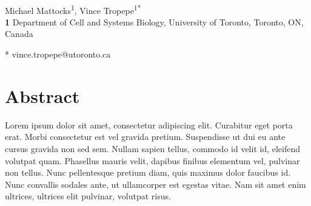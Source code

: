 \documentclass[10pt,letterpaper]{article}
\begin{document}
\vspace*{0.2in}

\begin{flushleft}
{\Large
\textbf{} %
}
\newline
\\
Michael Mattocks\textsuperscript{1},
Vince Tropepe\textsuperscript{1*}
\\
\bigskip
\textbf{1} Department of Cell and Systems Biology, University of Toronto, Toronto, ON, Canada
\\
\bigskip

% 
%





* vince.tropepe@utoronto.ca

\end{flushleft}
\section*{Abstract}
Lorem ipsum dolor sit amet, consectetur adipiscing elit. Curabitur eget porta erat. Morbi consectetur est vel gravida pretium. Suspendisse ut dui eu ante cursus gravida non sed sem. Nullam sapien tellus, commodo id velit id, eleifend volutpat quam. Phasellus mauris velit, dapibus finibus elementum vel, pulvinar non tellus. Nunc pellentesque pretium diam, quis maximus dolor faucibus id. Nunc convallis sodales ante, ut ullamcorper est egestas vitae. Nam sit amet enim ultrices, ultrices elit pulvinar, volutpat risus.
\end{document}
